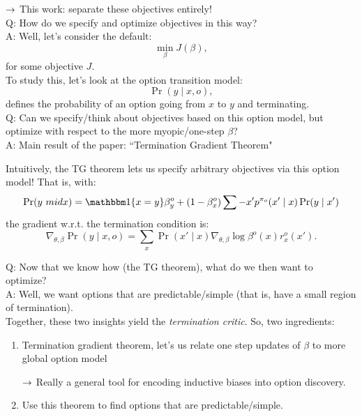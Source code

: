 $\rightarrow$ This work: separate these objectives entirely! \\

Q: How do we specify and optimize objectives in this way? \\

A: Well, let's consider the default:
\[
\min_\beta J(\beta),
\]
for some objective $J$. \\

To study this, let's look at the option transition model:
\[
\Pr(y \mid x, o),
\]
defines the probability of an option going from $x$ to $y$ and terminating. \\

Q: Can we specify/think about objectives based on this option model, but optimize with respect to the more myopic/one-step $\beta$? \\

A: Main result of the paper: ``Termination Gradient Theorem"

\begin{theorem}
Intuitively, the TG theorem lets us specify arbitrary objectives via this option model! That is, with:
\[
\Pr(y\ mid x) = \indic\{x=y\} \beta_y^o + (1-\beta_x^o) \sum-{x'} p^{\pi_o}(x' \mid x) \Pr(y \mid x')
\]
the gradient w.r.t. the termination condition is:
\[
\nabla_{\theta,\beta} \Pr(y \mid x, o) = \sum_x \Pr(x' \mid x) \nabla_{\theta,\beta} \log \beta^o(x) r_{x}^o(x').
\]
\end{theorem}

Q: Now that we know how (the TG theorem), what do we then want to optimize? \\

A: Well, we want options that are predictable/simple (that is, have a small region of termination). \\

Together, these two insights yield the {\it termination critic}. So, two ingredients: 

\begin{enumerate}
    \item Termination gradient theorem, let's us relate one step updates of $\beta$ to more global option model
    
    $\rightarrow$ Really a general tool for encoding inductive biases into option discovery.
    
    \item Use this theorem to find options that are predictable/simple.
\end{enumerate}

